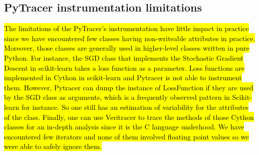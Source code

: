 \documentclass[10pt,journal,compsoc]{IEEEtran}
\newcommand{\pytracer}[0]{PyTracer\xspace}
\DeclareRobustCommand{\add}[1]{\sethlcolor{lightgreen}\hl{#1}}
\begin{document}






\subsection{\pytracer instrumentation limitations}

\add{
    The limitations of the PyTracer's instrumentation have little impact in practice
    since we have encountered few classes having non-writeable attributes in practice.
    Moreover, those classes are generally used in higher-level classes written in
    pure Python. For instance, the SGD class that implements the Stochastic Gradient
    Descent in scikit-learn takes a loss function as a parameter. Loss functions are
    implemented in Cython in scikit-learn and Pytracer is not able to instrument
    them. However, Pytracer can dump the instance of LossFunction if they are used
    by the SGD class as arguments, which is a frequently observed pattern in
    Scikit-learn for instance. So one still has an estimation of variability for the
    attributes of the class. Finally, one can use Veritracer to trace the methods of
    those Cython classes for an in-depth analysis since it is the C language
    underhood. We have encountered few iterators and none of them involved floating
    point values so we were able to safely ignore them. 
}
\end{document}
